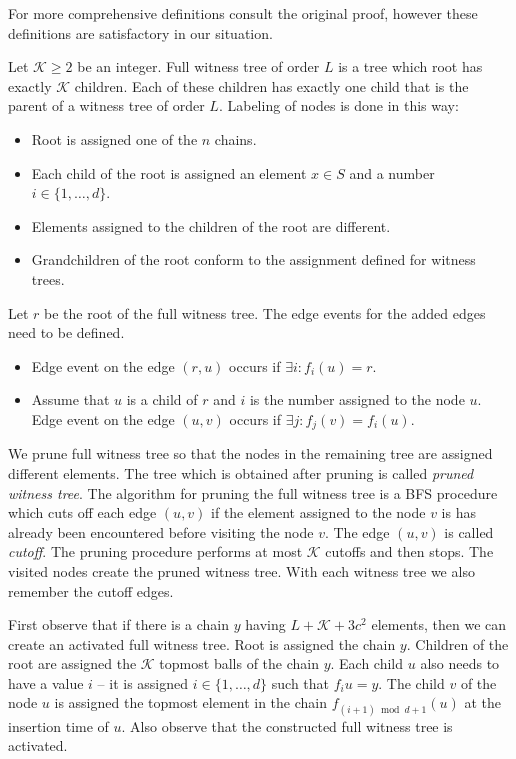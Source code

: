 For more comprehensive definitions consult the original proof, however these definitions are satisfactory in our situation.

\begin{definition}
Let $\mathcal{K} \geq 2$ be an integer. Full witness tree of order $L$ is a tree which root has exactly $\mathcal{K}$ children. Each of these children has exactly one child that is the parent of a witness tree of order $L$. Labeling of nodes is done in this way:
\begin{itemize}
	\item Root is assigned one of the $n$ chains. 
	\item Each child of the root is assigned an element $x \in S$ and a number $i \in \{1, \dots, d\}$.
	\item Elements assigned to the children of the root are different.
	\item Grandchildren of the root conform to the assignment defined for witness trees.
\end{itemize}

Let $r$ be the root of the full witness tree.
The edge events for the added edges need to be defined. 
\begin{itemize}
	\item Edge event on the edge $(r, u)$ occurs if $\exists i: f_i(u) = r$.
	\item Assume that $u$ is a child of $r$ and $i$ is the number assigned to the node $u$. Edge event on the edge $(u, v)$ occurs if $\exists j: f_j(v) = f_i(u)$.
\end{itemize}
\end{definition}

We prune full witness tree so that the nodes in the remaining tree are assigned different elements.
The tree which is obtained after pruning is called \emph{pruned witness tree}.
The algorithm for pruning the full witness tree is a BFS procedure which cuts off each edge $(u, v)$ if the element assigned to the node $v$ is has already been encountered before visiting the node $v$.
The edge $(u, v)$ is called \emph{cutoff}.
The pruning procedure performs at most $\mathcal{K}$ cutoffs and then stops.
The visited nodes create the pruned witness tree.
With each witness tree we also remember the cutoff edges.

First observe that if there is a chain $y$ having $L + \mathcal{K} + 3c^2$ elements, then we can create an activated full witness tree.
Root is assigned the chain $y$.
Children of the root are assigned the $\mathcal{K}$ topmost balls of the chain $y$.
Each child $u$ also needs to have a value $i$ -- it is assigned $i \in \{1, \dots, d\}$ such that $f_i{u} = y$. 
The child $v$ of the node $u$ is assigned the topmost element in the chain $f_{(i + 1) \bmod d + 1}(u)$ at the insertion time of $u$.
Also observe that the constructed full witness tree is activated.

